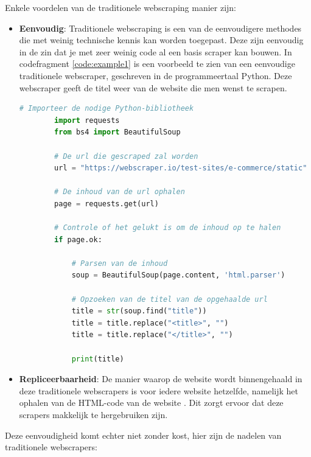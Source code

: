 Enkele voordelen van de traditionele webscraping manier zijn:
\begin{itemize}
    \item \textbf{Eenvoudig}: Traditionele webscraping is een van de eenvoudigere methodes die met weinig technische kennis kan worden toegepast. Deze zijn eenvoudig in de zin dat je met zeer weinig code al een basis scraper kan bouwen. In codefragment \ref{code:example1} is een voorbeeld te zien van een eenvoudige traditionele webscraper, geschreven in de programmeertaal Python. Deze webscraper geeft de titel weer van de website die men wenst te scrapen.

    \begin{lstlisting}[language=python, captionpos=b, caption={Een voorbeeld van een eenvoudige webscraper.}, label={code:example1}]
        # Importeer de nodige Python-bibliotheek
        import requests
        from bs4 import BeautifulSoup

        # De url die gescraped zal worden
        url = "https://webscraper.io/test-sites/e-commerce/static"

        # De inhoud van de url ophalen
        page = requests.get(url)

        # Controle of het gelukt is om de inhoud op te halen
        if page.ok:

            # Parsen van de inhoud
            soup = BeautifulSoup(page.content, 'html.parser')

            # Opzoeken van de titel van de opgehaalde url
            title = str(soup.find("title"))
            title = title.replace("<title>", "")
            title = title.replace("</title>", "")

            print(title)
    \end{lstlisting}

    \item \textbf{Repliceerbaarheid}: De manier waarop de website wordt binnengehaald in deze traditionele webscrapers is voor iedere website hetzelfde, namelijk het ophalen van de HTML-code van de website . Dit zorgt ervoor dat deze scrapers makkelijk te hergebruiken zijn.
\end{itemize}

Deze eenvoudigheid komt echter niet zonder kost, hier zijn de nadelen van traditionele webscrapers:

